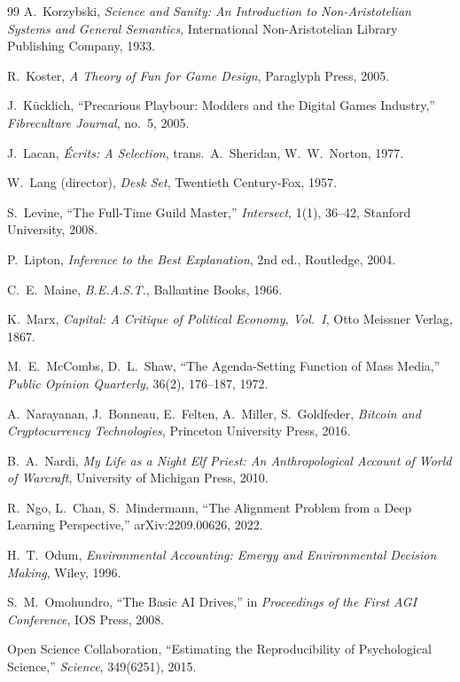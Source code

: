 \begin{thebibliography}{99}
A.~Korzybski, \textit{Science and Sanity: An Introduction to Non-Aristotelian Systems and General Semantics}, International Non-Aristotelian Library Publishing Company, 1933.

R.~Koster, \textit{A Theory of Fun for Game Design}, Paraglyph Press, 2005.

J.~Kücklich, ``Precarious Playbour: Modders and the Digital Games Industry,'' \textit{Fibreculture Journal}, no.~5, 2005.

J.~Lacan, \textit{Écrits: A Selection}, trans.\ A.~Sheridan, W.~W.~Norton, 1977.

W.~Lang (director), \textit{Desk Set}, Twentieth Century-Fox, 1957.

S.~Levine, ``The Full-Time Guild Master,'' \textit{Intersect}, 1(1), 36--42, Stanford University, 2008.

P.~Lipton, \textit{Inference to the Best Explanation}, 2nd ed., Routledge, 2004.

C.~E.~Maine, \textit{B.E.A.S.T.}, Ballantine Books, 1966.

K.~Marx, \textit{Capital: A Critique of Political Economy, Vol.~I}, Otto Meissner Verlag, 1867.

M.~E.~McCombs, D.~L.~Shaw, ``The Agenda-Setting Function of Mass Media,'' \textit{Public Opinion Quarterly}, 36(2), 176--187, 1972.

A.~Narayanan, J.~Bonneau, E.~Felten, A.~Miller, S.~Goldfeder, \textit{Bitcoin and Cryptocurrency Technologies}, Princeton University Press, 2016.

B.~A.~Nardi, \textit{My Life as a Night Elf Priest: An Anthropological Account of World of Warcraft}, University of Michigan Press, 2010.

R.~Ngo, L.~Chan, S.~Mindermann, ``The Alignment Problem from a Deep Learning Perspective,'' arXiv:2209.00626, 2022.

H.~T.~Odum, \textit{Environmental Accounting: Emergy and Environmental Decision Making}, Wiley, 1996.

S.~M.~Omohundro, ``The Basic AI Drives,'' in \textit{Proceedings of the First AGI Conference}, IOS Press, 2008.

Open Science Collaboration, ``Estimating the Reproducibility of Psychological Science,'' \textit{Science}, 349(6251), 2015.


\end{thebibliography}
